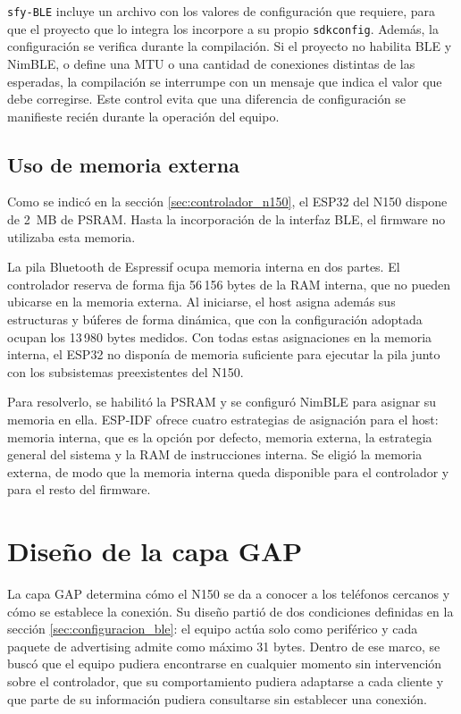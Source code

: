\texttt{sfy-BLE} incluye un archivo con los valores de configuración que requiere, para que el proyecto que lo integra los incorpore a su propio \texttt{sdkconfig}. Además, la configuración se verifica durante la compilación. Si el proyecto no habilita BLE y NimBLE, o define una MTU o una cantidad de conexiones distintas de las esperadas, la compilación se interrumpe con un mensaje que indica el valor que debe corregirse. Este control evita que una diferencia de configuración se manifieste recién durante la operación del equipo.

\subsection{Uso de memoria externa}
\label{subsec:config_psram}

Como se indicó en la sección \ref{sec:controlador_n150}, el ESP32 del N150 dispone de 2~MB de PSRAM. Hasta la incorporación de la interfaz BLE, el firmware no utilizaba esta memoria.

La pila Bluetooth de Espressif ocupa memoria interna en dos partes. El controlador reserva de forma fija 56\,156 bytes de la RAM interna, que no pueden ubicarse en la memoria externa. Al iniciarse, el host asigna además sus estructuras y búferes de forma dinámica, que con la configuración adoptada ocupan los 13\,980 bytes medidos. Con todas estas asignaciones en la memoria interna, el ESP32 no disponía de memoria suficiente para ejecutar la pila junto con los subsistemas preexistentes del N150.

Para resolverlo, se habilitó la PSRAM y se configuró NimBLE para asignar su memoria en ella. ESP-IDF ofrece cuatro estrategias de asignación para el host: memoria interna, que es la opción por defecto, memoria externa, la estrategia general del sistema y la RAM de instrucciones interna. Se eligió la memoria externa, de modo que la memoria interna queda disponible para el controlador y para el resto del firmware.


\section{Diseño de la capa GAP}
\label{sec:diseno_gap}

La capa GAP determina cómo el N150 se da a conocer a los teléfonos cercanos y cómo se establece la conexión. Su diseño partió de dos condiciones definidas en la sección \ref{sec:configuracion_ble}: el equipo actúa solo como periférico y cada paquete de advertising admite como máximo 31 bytes. Dentro de ese marco, se buscó que el equipo pudiera encontrarse en cualquier momento sin intervención sobre el controlador, que su comportamiento pudiera adaptarse a cada cliente y que parte de su información pudiera consultarse sin establecer una conexión.

